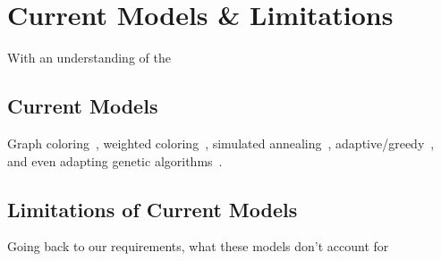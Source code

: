 
\section{Current Models \& Limitations}

With an understanding of the 

\subsection{Current Models}

Graph coloring~\cite{utilfair,unified},  weighted coloring~\cite{weighted}, simulated annealing~\cite{taw are}, adaptive/greedy~\cite{whitefi,ding}, and even adapting genetic algorithms~\cite{ding}.

\subsection{Limitations of Current Models}

Going back to our requirements, what these models don't account for
